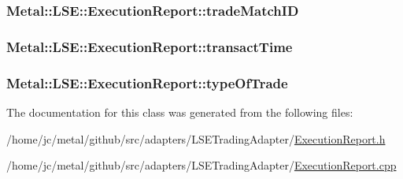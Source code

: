 \subsubsection[{trade\+Match\+I\+D}]{ Metal\+::\+L\+S\+E\+::\+Execution\+Report\+::trade\+Match\+I\+D}\label{classMetal_1_1LSE_1_1ExecutionReport_af1a9f56e131ce7a40e4b9789e35f76a7}
\hypertarget{classMetal_1_1LSE_1_1ExecutionReport_af53286cedfca6d09c3f4b3a138468861}{}
\subsubsection[{transact\+Time}]{ Metal\+::\+L\+S\+E\+::\+Execution\+Report\+::transact\+Time}\label{classMetal_1_1LSE_1_1ExecutionReport_af53286cedfca6d09c3f4b3a138468861}
\hypertarget{classMetal_1_1LSE_1_1ExecutionReport_ac792bd8a4c7af225d31b726b3c8c02af}{}
\subsubsection[{type\+Of\+Trade}]{ Metal\+::\+L\+S\+E\+::\+Execution\+Report\+::type\+Of\+Trade}\label{classMetal_1_1LSE_1_1ExecutionReport_ac792bd8a4c7af225d31b726b3c8c02af}


The documentation for this class was generated from the following files\+:\begin{DoxyCompactItemize}
\item 
/home/jc/metal/github/src/adapters/\+L\+S\+E\+Trading\+Adapter/\hyperlink{ExecutionReport_8h}{Execution\+Report.\+h}\item 
/home/jc/metal/github/src/adapters/\+L\+S\+E\+Trading\+Adapter/\hyperlink{ExecutionReport_8cpp}{Execution\+Report.\+cpp}\end{DoxyCompactItemize}
